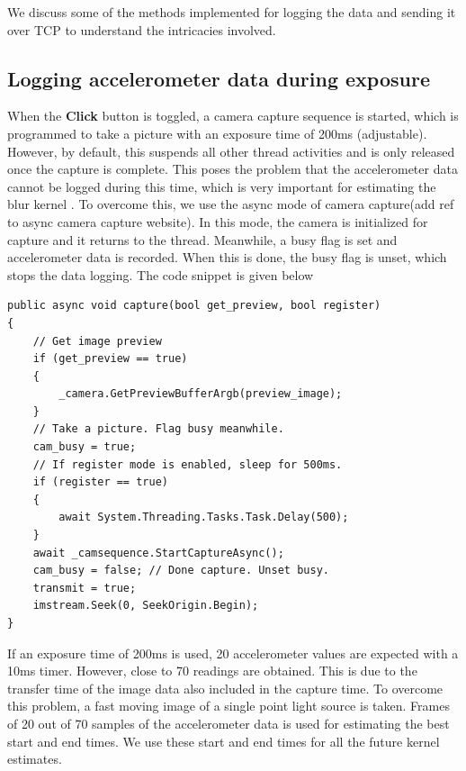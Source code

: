 \documentclass[BTech]{iitmdiss}
\begin{document}
We discuss some of the methods implemented for logging the data and 
sending it over TCP to understand the intricacies involved.

\subsection{Logging accelerometer data during exposure}
\label{device:device_app:cam}
When the \textbf{Click} button is toggled, a camera capture sequence
is started, which is programmed to take a picture with an exposure time
of 200ms (adjustable). However, by default, this suspends all other 
thread activities and is only released once the capture is complete. 
This poses the problem that the accelerometer data cannot be logged 
during this time, which is very important for estimating the blur kernel
. To overcome this, we use the async mode of camera capture(add ref to
async camera capture website). In this mode, the camera is initialized
for capture and it returns to the thread. Meanwhile, a busy flag is set
and accelerometer data is recorded. When this is done, the busy flag is
unset, which stops the data logging. The code snippet is given below

\begin{singlespacing}
\begin{lstlisting}[style=sharpclisting]
public async void capture(bool get_preview, bool register)
{
    // Get image preview
    if (get_preview == true)
    {
        _camera.GetPreviewBufferArgb(preview_image);
    }
    // Take a picture. Flag busy meanwhile.
    cam_busy = true;
    // If register mode is enabled, sleep for 500ms.
    if (register == true)
    {
        await System.Threading.Tasks.Task.Delay(500);
    }
    await _camsequence.StartCaptureAsync();
    cam_busy = false; // Done capture. Unset busy.
    transmit = true;
    imstream.Seek(0, SeekOrigin.Begin);
}
\end{lstlisting}
\end{singlespacing}

If an exposure time of 200ms is used, 20 accelerometer values are 
expected with a 10ms timer. However, close to 70 readings are obtained.
This is due to the transfer time of the image data also included in the
capture time. To overcome this problem, a fast moving image of a single
point light source is taken. Frames of 20 out of 70 samples of the
accelerometer data is used for estimating the best start and end times.
We use these start and end times for all the future kernel estimates.
\end{document}
